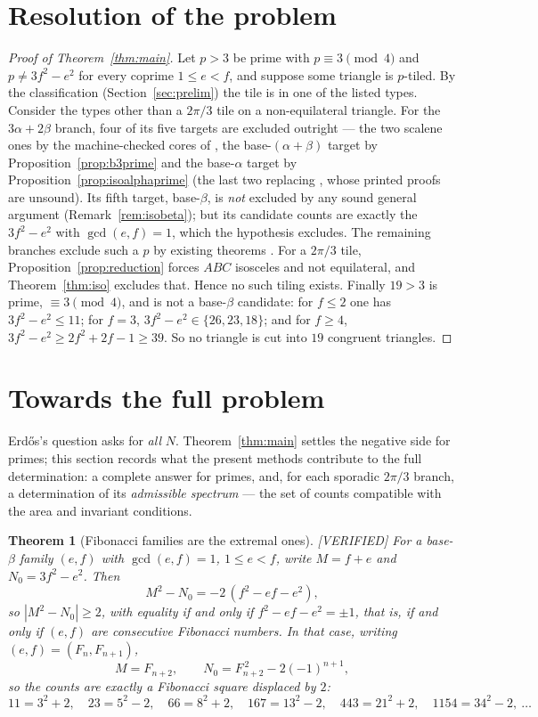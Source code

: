 \documentclass[11pt,reqno]{amsart}
\theoremstyle{plain}
\newtheorem{theorem}{Theorem}
\theoremstyle{definition}
\newcommand{\lab}[1]{\hfill\textnormal{\footnotesize\textsc{[#1]}}}
\begin{document}
\section{Resolution of the problem}\label{sec:assembly}

\begin{proof}[Proof of Theorem~\ref{thm:main}]
Let $p>3$ be prime with $p\equiv3\pmod4$ and $p\ne3f^2-e^2$ for every coprime $1\le e<f$, and
suppose some triangle is $p$-tiled. By the classification (Section~\ref{sec:prelim}) the tile is in
one of the listed types. Consider the types other than a $2\pi/3$ tile on a non-equilateral triangle.
For the $3\alpha+2\beta$ branch, four of its five targets are excluded outright --- the two scalene
ones by the machine-checked cores of \cite[Thms.~8, 12]{BeesonIII}, the base-$(\alpha{+}\beta)$ target
by Proposition~\ref{prop:b3prime} and the base-$\alpha$ target by
Proposition~\ref{prop:isoalphaprime} (the last two replacing \cite[Thms.~18, 20]{BeesonIII}, whose
printed proofs are unsound). Its fifth target, base-$\beta$, is \emph{not} excluded by any sound
general argument (Remark~\ref{rem:isobeta}); but its candidate counts are exactly the $3f^2-e^2$ with
$\gcd(e,f)=1$, which the hypothesis excludes. The remaining branches exclude such a $p$ by existing
theorems \cite{SWW, BeesonI, BeesonSeven, BeesonIso, BeesonEq}. For a $2\pi/3$ tile,
Proposition~\ref{prop:reduction} forces $ABC$ isosceles and not equilateral, and
Theorem~\ref{thm:iso} excludes that. Hence no such tiling exists. Finally $19>3$ is prime,
$\equiv3\pmod4$, and is not a base-$\beta$ candidate: for $f\le2$ one has $3f^2-e^2\le11$; for $f=3$,
$3f^2-e^2\in\{26,23,18\}$; and for $f\ge4$, $3f^2-e^2\ge2f^2+2f-1\ge39$. So no triangle is cut into
$19$ congruent triangles.
\end{proof}

\section{Towards the full problem}\label{sec:full}

Erd\H{o}s's question asks for \emph{all} $N$. Theorem~\ref{thm:main} settles the negative side for
primes; this section records what the present methods contribute to the full determination: a
complete answer for primes, and, for each sporadic $2\pi/3$ branch, a determination of its
\emph{admissible spectrum} --- the set of counts compatible with the area and invariant conditions.

\begin{theorem}[Fibonacci families are the extremal ones]\label{thm:fib}\lab{VERIFIED}
For a base-$\beta$ family $(e,f)$ with $\gcd(e,f)=1$, $1\le e<f$, write $M=f+e$ and
$N_0=3f^2-e^2$. Then
\[
M^2-N_0=-2\,(f^2-ef-e^2),
\]
so $|M^2-N_0|\ge2$, with equality if and only if $f^2-ef-e^2=\pm1$, that is, if and only if $(e,f)$
are consecutive Fibonacci numbers. In that case, writing $(e,f)=(F_n,F_{n+1})$,
\[
M=F_{n+2},\qquad N_0=F_{n+2}^{\,2}-2(-1)^{n+1},
\]
so the counts are exactly a Fibonacci square displaced by $2$:
\[
11=3^2{+}2,\quad 23=5^2{-}2,\quad 66=8^2{+}2,\quad 167=13^2{-}2,\quad 443=21^2{+}2,\quad
1154=34^2{-}2,\ \dots
\]
\end{theorem}
\end{document}
